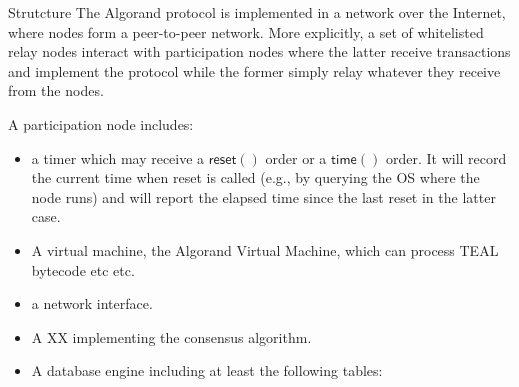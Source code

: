 \documentclass[10pt,a4paper]{article}
\begin{document}
\begin{section}{Strutcture}
The Algorand protocol is implemented in a network over the Internet, where nodes 
form a peer-to-peer network. More explicitly, a set of whitelisted relay nodes 
interact with participation nodes where the latter receive transactions and
implement the protocol while the former simply relay whatever they receive from
the nodes.

A participation node includes:
\begin{itemize}
    \item a timer which may receive a $\mathsf{reset()}$ order or a $\mathsf{time()}$
order. It will record the current time when reset is called (e.g., by querying
the OS where the node runs) and will report the elapsed time since the last reset
in the latter case.
    \item A virtual machine, the Algorand Virtual Machine, which can process TEAL bytecode
etc etc.
    \item a network interface.
    \item A XX implementing the consensus algorithm.
    \item A database engine including at least the following tables:
\end{itemize}



\end{section}
\end{document}

